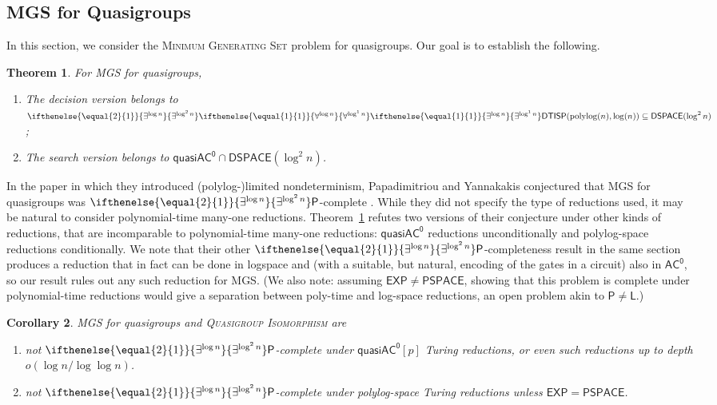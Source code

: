 \documentclass{article}
\newtheorem{theorem}{Theorem}\newtheorem{lemma}[theorem]{Lemma}\newtheorem{proposition}[theorem]{Proposition}\newtheorem{corollary}[theorem]{Corollary}\newtheorem{definition}[theorem]{Definition}\newtheorem{claim}[theorem]{Claim}\newtheorem{remark}[theorem]{Remark}\newtheorem{observation}[theorem]{Observation}\newtheorem{conjecture}[theorem]{Conjecture}\newtheorem{example}[theorem]{Example}
\newcommand{\algprobm}[1]{\textsc{#1}\xspace}
\newcommand{\betacc}[1]{\ifthenelse{\equal{#1}{1}}{\exists^{\log n}}{\exists^{\log^{#1}n}}} %
\newcommand{\alphacc}[1]{\ifthenelse{\equal{#1}{1}}{\forall^{\log n}}{\forall^{\log^{#1}n}}} %
\newcommand*{\ComplexityClass}[1]{\ensuremath{\mathsf{#1}}\xspace}
\renewcommand{\P}{\ComplexityClass{P}}
\newcommand*{\EXP}{\ComplexityClass{EXP}}
\newcommand{\DTISP}{\ComplexityClass{DTISP}}
\newcommand{\DTISPpll}{\ensuremath{\DTISP(\mathrm{polylog}(n),\mathrm{log}(n))}\xspace}
\newcommand*{\LogSpace}{\ComplexityClass{L}}
\newcommand*{\PSPACE}{\ComplexityClass{PSPACE}}
\newcommand{\ACz}{\ComplexityClass{AC^0}}
\newcommand{\qACz}{\ComplexityClass{quasiAC^0}}
\begin{document}
\subsection{\algprobm{MGS} for Quasigroups}
In this section, we consider the \algprobm{Minimum Generating Set} problem for quasigroups. Our goal is to establish the following.

\begin{theorem} \label{thm:MGSqAC0}
For \algprobm{MGS} for quasigroups, 
\renewcommand{\theenumi}{\alph{enumi}}
\begin{enumerate}
\item \label{thm:MGSqAC0:NTIME} The decision version belongs to $\betacc{2}\alphacc{1}\betacc{1}\DTISPpll \subseteq \mathsf{DSPACE}(\log^2 n)$;


\item \label{thm:MGSqAC0:search} The search version belongs to $\qACz \cap \mathsf{DSPACE}(\log^2 n)$.
\end{enumerate}
\end{theorem}

In the paper in which they introduced (polylog-)limited nondeterminism, Papadimitriou and Yannakakis conjectured that MGS for quasigroups was $\betacc{2}\P$-complete \cite[after Thm.~7]{PY}. While they did not specify the type of reductions used, it may be natural to consider polynomial-time many-one reductions. Theorem~\ref{thm:MGSqAC0} refutes two versions of their conjecture under other kinds of reductions, that are incomparable to polynomial-time many-one reductions: $\qACz$ reductions unconditionally and polylog-space reductions conditionally. We note that their other $\betacc{2}\P$-completeness result in the same section produces a reduction that in fact can be done in logspace and (with a suitable, but natural, encoding of the gates in a circuit) also in $\ACz$, so our result rules out any such reduction for \algprobm{MGS}. 
(We also note: assuming $\EXP \neq \PSPACE$, showing that this problem is complete under polynomial-time reductions would give a separation between poly-time and log-space reductions, an open problem akin to $\P \neq \LogSpace$.) 


\renewcommand{\theenumi}{\alph{enumi}}
\begin{corollary}
\algprobm{MGS} for quasigroups and \algprobm{Quasigroup Isomorphism} are 
\begin{enumerate}
\item not $\betacc{2} \P$-complete under $\qACz[p]$ Turing reductions, or even such reductions up to depth $o(\log n / \log \log n)$.

\item not $\betacc{2} \P$-complete under polylog-space Turing reductions unless $\mathsf{EXP} = \mathsf{PSPACE}$.
\end{enumerate}
\end{corollary}
\end{document}
